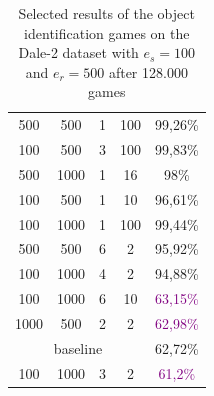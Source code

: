 \begin{table}[ht]
\begin{tabular}{cccc|c}
        {500}                         & {500}     & {1} & {100} & {99,26\%}                           \\
        {100}                         & {500}     & {3} & {100} & {99,83\%}                           \\
        {500}                         & {1000}    & {1} & {16}  & {98\%}                              \\
        {100}                         & {500}     & {1} & {10}  & {96,61\%}                           \\
        {100}                         & {1000}    & {1} & {100} & {99,44\%}                           \\
        {500}                         & {500}     & {6} & {2}   & {95,92\%}                           \\
        {100}                         & {1000}    & {4} & {2}   & {94,88\%}                           \\
        {100}                         & {1000}    & {6} & {10}  & \textcolor{purple}{63,15\%}         \\
        {1000}                        & {500}     & {2} & {2}   & \textcolor{purple}{62,98\%}         \\\midrule
        \multicolumn{4}{c|}{baseline} & {62,72\%}                                                     \\\midrule
        {100}                         & {1000}    & {3} & {2}   & \textcolor{purple}{61,2\%}          \\
        \bottomrule
    \end{tabular}
    \caption{Selected results of the object identification games on the Dale-2 dataset with $e_s=100$ and $e_r=500$ after 128.000 games}
    \label{tab:results_discriminator_dale-2}
\end{table}

